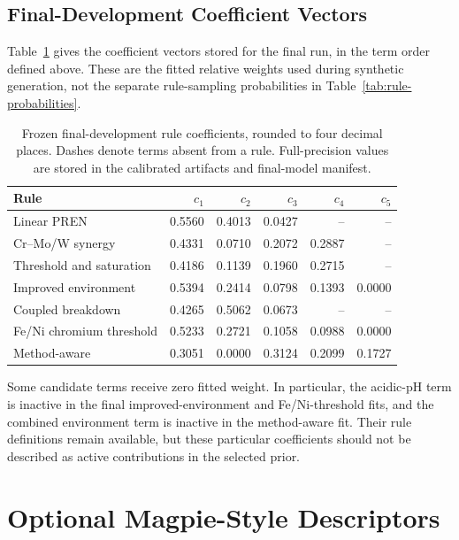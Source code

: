 \documentclass{article}
\begin{document}
\subsection{Final-Development Coefficient Vectors}

Table~\ref{tab:rule-coefficients} gives the coefficient vectors stored for
the final run, in the term order defined above. These are the fitted relative
weights used during synthetic generation, not the separate rule-sampling
probabilities in Table~\ref{tab:rule-probabilities}.

\begin{table}[htbp]
\centering
\caption{Frozen final-development rule coefficients, rounded to four decimal
places. Dashes denote terms absent from a rule. Full-precision values are
stored in the calibrated artifacts and final-model manifest.}
\label{tab:rule-coefficients}
\small
\begin{tabular}{lrrrrr}
\toprule
Rule & \(c_1\) & \(c_2\) & \(c_3\) & \(c_4\) & \(c_5\) \\
\midrule
Linear PREN & 0.5560 & 0.4013 & 0.0427 & -- & -- \\
Cr--Mo/W synergy & 0.4331 & 0.0710 & 0.2072 & 0.2887 & -- \\
Threshold and saturation & 0.4186 & 0.1139 & 0.1960 & 0.2715 & -- \\
Improved environment & 0.5394 & 0.2414 & 0.0798 & 0.1393 & 0.0000 \\
Coupled breakdown & 0.4265 & 0.5062 & 0.0673 & -- & -- \\
Fe/Ni chromium threshold & 0.5233 & 0.2721 & 0.1058 & 0.0988 & 0.0000 \\
Method-aware & 0.3051 & 0.0000 & 0.3124 & 0.2099 & 0.1727 \\
\bottomrule
\end{tabular}
\end{table}

Some candidate terms receive zero fitted weight. In particular, the acidic-pH
term is inactive in the final improved-environment and Fe/Ni-threshold fits,
and the combined environment term is inactive in the method-aware fit.
Their rule definitions remain available, but these particular coefficients
should not be described as active contributions in the selected prior.

\section{Optional Magpie-Style Descriptors}
\label{app:magpie}
\end{document}
